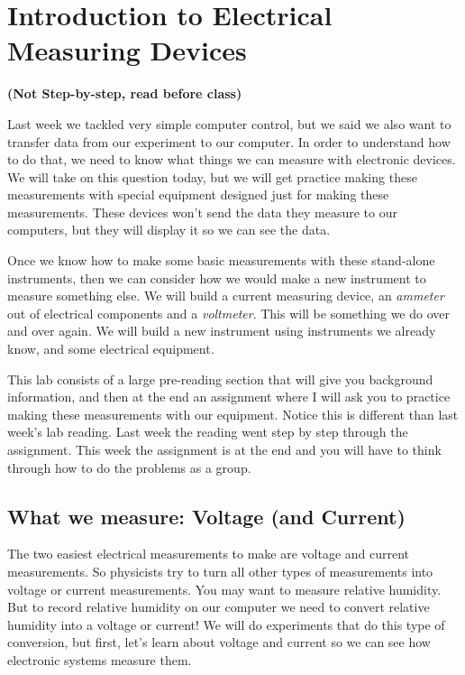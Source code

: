 \chapter{Introduction to Electrical Measuring Devices}
\LARGE \textbf{(Not Step-by-step, read before class)}
\normalsize
\vspace{0.25in}

Last week we tackled very simple computer control, but we said we also want
to transfer data from our experiment to our computer. In order to understand
how to do that, we need to know what things we can measure with electronic
devices. We will take on this question today, but we will get practice
making these measurements with special equipment designed just for making
these measurements. These devices won't send the data they measure to our
computers, but they will display it so we can see the data.

Once we know how to make some basic measurements with these stand-alone
instruments, then we can consider how we would make a new instrument to
measure something else. We will build a current measuring device, an \emph{
ammeter} out of electrical components and a \emph{voltmeter}. This will be
something we do over and over again. We will build a new instrument using
instruments we already know, and some electrical equipment.

This lab consists of a large pre-reading section that will give you
background information, and then at the end an assignment where I will ask
you to practice making these measurements with our equipment. Notice this is
different than last week's lab reading. Last week the reading went step by
step through the assignment. This week the assignment is at the end and you
will have to think through how to do the problems as a group.

\section{What we measure: Voltage (and Current)\label{Voltage Measurement
with Meter}}

The two easiest electrical measurements to make are voltage and current
measurements. So physicists try to turn all other types of measurements into
voltage or current measurements. You may want to measure relative humidity.
But to record relative humidity on our computer we need to convert relative
humidity into a voltage or current! We will do experiments that do this type
of conversion, but first, let's learn about voltage and current so we can
see how electronic systems measure them.

